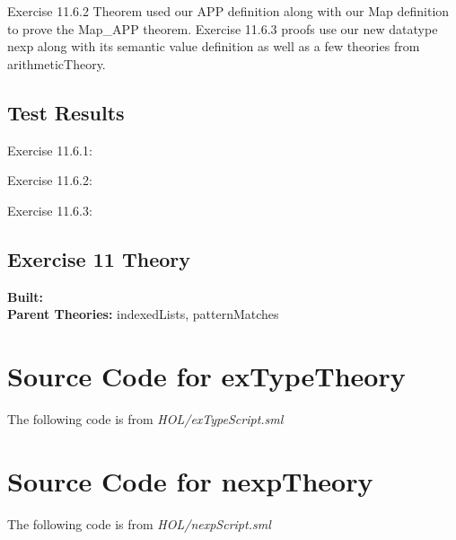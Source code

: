 \documentclass[11pt, twoside]{article}
\begin{document}
Exercise 11.6.2 Theorem used our APP definition along with our Map definition to prove the Map_APP theorem.
Exercise 11.6.3 proofs use our new datatype nexp along with its semantic value definition as well as a few
theories from arithmeticTheory.

\subsection{Test Results}
\label{sec:test-results}

Exercise 11.6.1:



Exercise 11.6.2:



Exercise 11.6.3:





\newpage

\HOLpagestyle

\subsection{Exercise 11 Theory}
\label{sec:exercise-11-theory}
\begin{flushleft}
\textbf{Built:} \HOLnexpDate \\[2pt]
\textbf{Parent Theories:} indexedLists, patternMatches
\end{flushleft}

\HOLexTypeTheorems
\HOLnexpTheorems


\HOLindex

\appendix{}

\section{Source Code for exTypeTheory}
\label{sec:source-code-extyp}

The following code is from \emph{HOL/exTypeScript.sml}


\section{Source Code for nexpTheory}
\label{sec:source-code-nexpth}

The following code is from \emph{HOL/nexpScript.sml}

\end{document}
